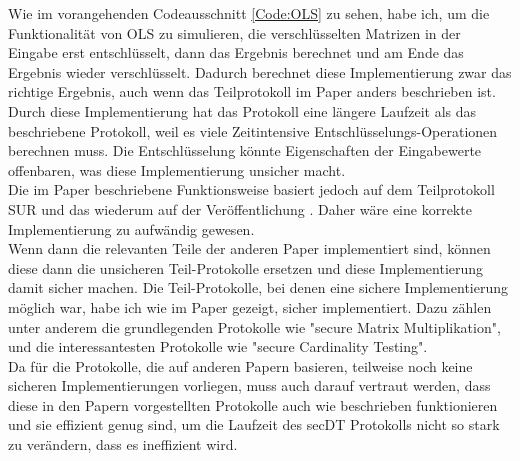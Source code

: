 Wie im vorangehenden Codeausschnitt \ref{Code:OLS} zu sehen, habe ich, um die Funktionalität von OLS zu simulieren, die verschlüsselten Matrizen in der Eingabe erst entschlüsselt, dann das Ergebnis berechnet und am Ende das Ergebnis wieder verschlüsselt. Dadurch berechnet diese Implementierung zwar das richtige Ergebnis, auch wenn das Teilprotokoll im Paper \cite{Doettling2021} anders beschrieben ist. Durch diese Implementierung hat das Protokoll eine längere Laufzeit als das beschriebene Protokoll, weil es viele Zeitintensive Entschlüsselungs-Operationen berechnen muss. Die Entschlüsselung könnte Eigenschaften der Eingabewerte offenbaren, was diese Implementierung unsicher macht.\\
Die im Paper beschriebene Funktionsweise basiert jedoch auf dem Teilprotokoll SUR und das wiederum auf der Veröffentlichung \cite{Schoenmakers}. Daher wäre eine korrekte Implementierung zu aufwändig gewesen.\\
Wenn dann die relevanten Teile der anderen Paper implementiert sind, können diese dann die unsicheren Teil-Protokolle ersetzen und diese Implementierung damit sicher machen.
Die Teil-Protokolle, bei denen eine sichere Implementierung möglich war, habe ich wie im Paper gezeigt, sicher implementiert. Dazu zählen unter anderem die grundlegenden Protokolle wie "secure Matrix Multiplikation", und die interessantesten Protokolle wie "secure Cardinality Testing".\\
Da für die Protokolle, die auf anderen Papern basieren, teilweise noch keine sicheren Implementierungen vorliegen, muss auch darauf vertraut werden, dass diese in den Papern vorgestellten Protokolle auch wie beschrieben funktionieren und sie effizient genug sind, um die Laufzeit des secDT Protokolls nicht so stark zu verändern, dass es ineffizient wird.\\



